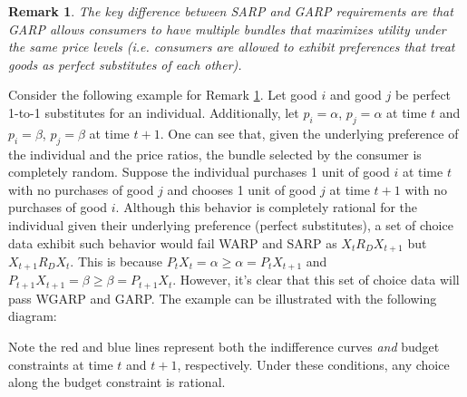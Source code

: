 \documentclass{article} %
\newtheorem{remark}{Remark}
\begin{document}
\begin{remark}
\label{rmk:Remark 3}
The key difference between SARP and GARP requirements are that GARP allows consumers to have multiple bundles that maximizes utility under the same price levels (i.e. consumers are allowed to exhibit preferences that treat goods as perfect substitutes of each other).
\end{remark}
Consider the following example for Remark \ref{rmk:Remark 3}. Let good $i$ and good $j$ be perfect 1-to-1 substitutes for an individual. Additionally, let $p_i=\alpha$, $p_j=\alpha$ at time $t$ and $p_i=\beta$, $p_j=\beta$ at time $t+1$. One can see that, given the underlying preference of the individual and the price ratios, the bundle selected by the consumer is completely random. Suppose the individual purchases 1 unit of good $i$ at time $t$ with no purchases of good $j$ and chooses 1 unit of good $j$ at time $t+1$ with no purchases of good $i$. Although this behavior is completely rational for the individual given their underlying preference (perfect substitutes), a set of choice data exhibit such behavior would fail WARP and SARP as $X_{t} R_D X_{t+1}$ but $X_{t+1} R_D X_{t}$. This is because $P_tX_t=\alpha\geq\alpha=P_tX_{t+1}$ and $P_{t+1}X_{t+1}=\beta\geq\beta=P_{t+1}X_t$. However, it's clear that this set of choice data will pass WGARP and GARP. The example can be illustrated with the following diagram:
\begin{center}
\end{center}
\noindent
Note the red and blue lines represent both the indifference curves \emph{and} budget constraints at time $t$ and $t+1$, respectively. Under these conditions, any choice along the budget constraint is rational. 
\end{document}
